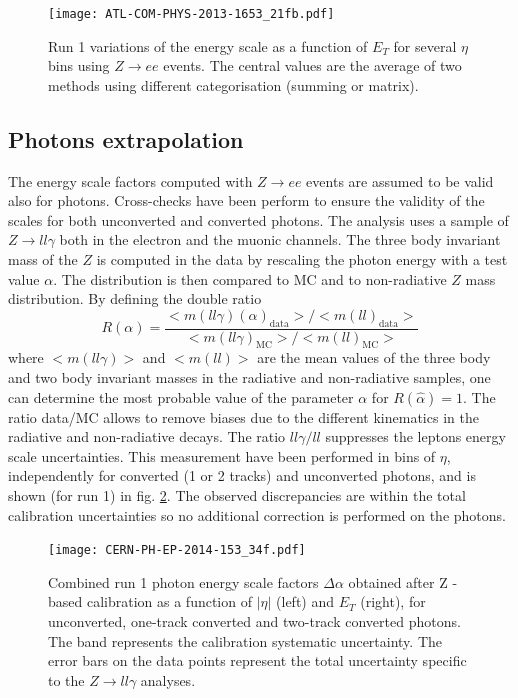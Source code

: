 \begin{figure}[htbp]
\centering
\texttt{[image: ATL-COM-PHYS-2013-1653\_21fb.pdf]}
\caption{\label{fig:Calibration_ETDepZ}
  Run 1 variations of the energy scale as a function of $E_T$ for several $\eta$ bins using $Z\rightarrow ee$ events.
  The central values are the average of two methods using different categorisation (summing or matrix).
\cite{ATL-COM-PHYS-2013-1653}}
\end{figure}


\subsection{Photons extrapolation}

The energy scale factors computed with $Z\rightarrow ee$ events are assumed to be valid also for photons.
Cross-checks have been perform to ensure the validity of the scales for both unconverted and converted photons.
The analysis uses a sample of $Z\rightarrow ll\gamma$ both in the electron and the muonic channels.
The three body invariant mass of the $Z$ is computed in the data by rescaling the photon energy with a test value $\alpha$.
The distribution is then compared to MC and to non-radiative $Z$ mass distribution.
By defining the double ratio
\begin{equation}
  R(\alpha) = \frac{<m(ll\gamma)(\alpha)_\text{data}>/<m(ll)_\text{data}>}{<m(ll\gamma)_\text{MC}>/<m(ll)_\text{MC}>}
\end{equation}
where $<m(ll\gamma)>$ and $<m(ll)>$ are the mean values of the three body and two body invariant masses in the radiative and non-radiative samples, one can determine the most probable value of the parameter $\alpha$ for $R(\hat{\alpha})=1$.
The ratio data/MC allows to remove biases due to the different kinematics in the radiative and non-radiative decays.
The ratio $ll\gamma / ll$ suppresses the leptons energy scale uncertainties.
This measurement have been performed in bins of $\eta$, independently for converted (1 or 2 tracks) and unconverted photons, and is shown (for run 1) in fig. \ref{fig:Calibration_photonScale}.
The observed discrepancies are within the total calibration uncertainties so no additional correction  is performed on the photons.

\begin{figure}[htbp]
\centering
\texttt{[image: CERN-PH-EP-2014-153\_34f.pdf]}
\caption{\label{fig:Calibration_photonScale}
  Combined run 1 photon energy scale factors $\Delta\alpha$ obtained after Z -based calibration as a function of $|\eta|$  (left) and $E_T$ (right), for unconverted, one-track converted and two-track converted photons.
  The band represents the calibration systematic   uncertainty.
  The error bars on the data points represent the total uncertainty specific to the $Z\rightarrow ll\gamma$ analyses.
\cite{CERN-PH-EP-2014-153}}
\end{figure}


